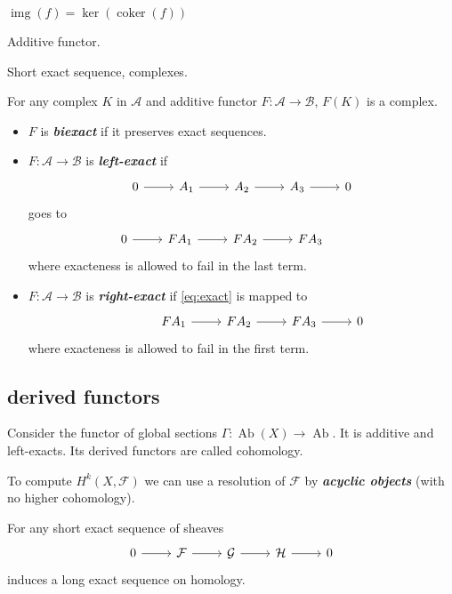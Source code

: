 \documentclass{article}
\newcommand{\Ac}{\mathcal{A}}
\newcommand{\Bc}{\mathcal{B}}
\newcommand{\Fc}{\mathcal{F}}
\newcommand{\Gc}{\mathcal{G}}
\newcommand{\Hc}{\mathcal{H}}
\DeclareMathOperator{\img}{img}
\DeclareMathOperator{\Ab}{Ab}
\DeclareMathOperator{\coker}{coker}
\begin{document}
\begin{defn}
	$\img(f)=\ker(\coker(f))$
\end{defn}
\begin{defn}
	Additive functor.
\end{defn}
\begin{defn}
	Short exact sequence, complexes.
\end{defn}
\begin{remark}
	For any complex $K$ in $\Ac$ and additive functor $F:\Ac\to\Bc$, $F(K)$ is a complex.
\end{remark}
\begin{defn}
	\begin{itemize}
		\item $F$ is \textbf{\textit{biexact}} if it preserves exact sequences.
		\item $F:\Ac\to\Bc$ is \textbf{\textit{left-exact}} if 
		\begin{equation}\label{eq:exact}
			\begin{tikzcd}
			0\arrow[r]&A_1\arrow[r]&A_2\arrow[r]&A_3\arrow[r]&0
		\end{tikzcd}
		\end{equation}
		goes to
		\[\begin{tikzcd}
			0\arrow[r]&FA_1\arrow[r]&FA_2\arrow[r]&FA_3\arrow[r,phantom]& \leavevmode
		\end{tikzcd}\]
		where exacteness is allowed to fail in the last term.
		\item $F:\Ac\to\Bc$ is \textbf{\textit{right-exact}} if \cref{eq:exact} is mapped to
		\[\begin{tikzcd}
			\leavevmode\arrow[r,phantom]&FA_1\arrow[r]&FA_2\arrow[r]&FA_3\arrow[r]& 0
		\end{tikzcd}\]
		where exacteness is allowed to fail in the first term.
	\end{itemize}
\end{defn}

\subsection{derived functors}
Consider the functor of global sections $\Gamma:\Ab(X)\to\Ab$. It is additive and left-exacts. Its derived functors are called cohomology.

To compute $H^k(X,\Fc)$ we can use a resolution of $\Fc$ by \textbf{\textit{acyclic objects}} (with no higher cohomology).

\begin{claim}
	For any short exact sequence of sheaves
	\[\begin{tikzcd}
		0\arrow[r]&\Fc\arrow[r]&\Gc\arrow[r]&\Hc\arrow[r]&0
	\end{tikzcd}\]
	induces a long exact sequence on homology.
\end{claim}
\end{document}
